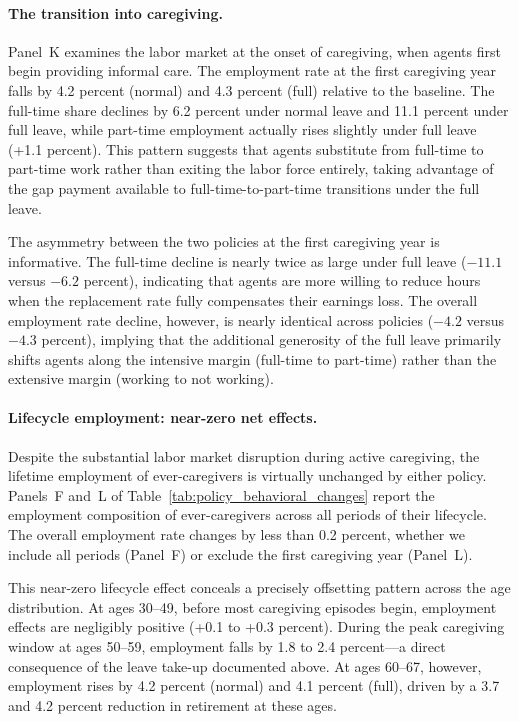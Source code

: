 \paragraph{The transition into caregiving.} Panel~K examines the labor market at the onset of caregiving, when agents first begin providing informal care. The employment rate at the first caregiving year falls by 4.2 percent (normal) and 4.3 percent (full) relative to the baseline. The full-time share declines by 6.2 percent under normal leave and 11.1 percent under full leave, while part-time employment actually rises slightly under full leave (+1.1 percent). This pattern suggests that agents substitute from full-time to part-time work rather than exiting the labor force entirely, taking advantage of the gap payment available to full-time-to-part-time transitions under the full leave.

The asymmetry between the two policies at the first caregiving year is informative. The full-time decline is nearly twice as large under full leave ($-11.1$ versus $-6.2$ percent), indicating that agents are more willing to reduce hours when the replacement rate fully compensates their earnings loss. The overall employment rate decline, however, is nearly identical across policies ($-4.2$ versus $-4.3$ percent), implying that the additional generosity of the full leave primarily shifts agents along the intensive margin (full-time to part-time) rather than the extensive margin (working to not working).

\paragraph{Lifecycle employment: near-zero net effects.} Despite the substantial labor market disruption during active caregiving, the lifetime employment of ever-caregivers is virtually unchanged by either policy. Panels~F and~L of Table~\ref{tab:policy_behavioral_changes} report the employment composition of ever-caregivers across all periods of their lifecycle. The overall employment rate changes by less than 0.2 percent, whether we include all periods (Panel~F) or exclude the first caregiving year (Panel~L).

This near-zero lifecycle effect conceals a precisely offsetting pattern across the age distribution. At ages 30--49, before most caregiving episodes begin, employment effects are negligibly positive (+0.1 to +0.3 percent). During the peak caregiving window at ages 50--59, employment falls by 1.8 to 2.4 percent---a direct consequence of the leave take-up documented above. At ages 60--67, however, employment rises by 4.2 percent (normal) and 4.1 percent (full), driven by a 3.7 and 4.2 percent reduction in retirement at these ages.

